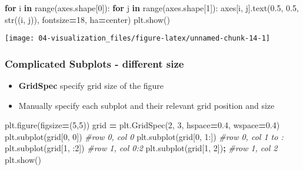 \documentclass[
]{book}
\newenvironment{Shaded}{\begin{snugshade}}{\end{snugshade}}
\newcommand{\BuiltInTok}[1]{#1}
\newcommand{\CommentTok}[1]{\textcolor[rgb]{0.37,0.37,0.37}{\textit{#1}}}
\newcommand{\ControlFlowTok}[1]{\textcolor[rgb]{0.27,0.27,0.27}{\textbf{#1}}}
\newcommand{\DecValTok}[1]{\textcolor[rgb]{0.06,0.06,0.06}{#1}}
\newcommand{\FloatTok}[1]{\textcolor[rgb]{0.06,0.06,0.06}{#1}}
\newcommand{\KeywordTok}[1]{\textcolor[rgb]{0.27,0.27,0.27}{\textbf{#1}}}
\newcommand{\NormalTok}[1]{#1}
\newcommand{\OperatorTok}[1]{\textcolor[rgb]{0.43,0.43,0.43}{\textbf{#1}}}
\newcommand{\StringTok}[1]{\textcolor[rgb]{0.5,0.5,0.5}{#1}}
\providecommand{\tightlist}{%
  \setlength{\itemsep}{0pt}\setlength{\parskip}{0pt}}
\begin{document}
\begin{Shaded}
\begin{Highlighting}[]
\ControlFlowTok{for}\NormalTok{ i }\KeywordTok{in} \BuiltInTok{range}\NormalTok{(axes.shape[}\DecValTok{0}\NormalTok{]):}
    \ControlFlowTok{for}\NormalTok{ j }\KeywordTok{in} \BuiltInTok{range}\NormalTok{(axes.shape[}\DecValTok{1}\NormalTok{]):}
\NormalTok{        axes[i, j].text(}\FloatTok{0.5}\NormalTok{, }\FloatTok{0.5}\NormalTok{, }\BuiltInTok{str}\NormalTok{((i, j)),}
\NormalTok{                      fontsize}\OperatorTok{=}\DecValTok{18}\NormalTok{, ha}\OperatorTok{=}\StringTok{\textquotesingle{}center\textquotesingle{}}\NormalTok{)}
\NormalTok{plt.show()}
\end{Highlighting}
\end{Shaded}

\texttt{[image: 04-visualization\_files/figure-latex/unnamed-chunk-14-1]}

\hypertarget{complicated-subplots---different-size}{%
\subsubsection{Complicated Subplots - different size}\label{complicated-subplots---different-size}}

\begin{itemize}
\tightlist
\item
  \textbf{GridSpec} specify grid size of the figure\\
\item
  Manually specify each subplot and their relevant grid position and size
\end{itemize}

\begin{Shaded}
\begin{Highlighting}[]
\NormalTok{plt.figure(figsize}\OperatorTok{=}\NormalTok{(}\DecValTok{5}\NormalTok{,}\DecValTok{5}\NormalTok{))}
\NormalTok{grid }\OperatorTok{=}\NormalTok{ plt.GridSpec(}\DecValTok{2}\NormalTok{, }\DecValTok{3}\NormalTok{, hspace}\OperatorTok{=}\FloatTok{0.4}\NormalTok{, wspace}\OperatorTok{=}\FloatTok{0.4}\NormalTok{)}
\NormalTok{plt.subplot(grid[}\DecValTok{0}\NormalTok{, }\DecValTok{0}\NormalTok{])  }\CommentTok{\#row 0, col 0}
\NormalTok{plt.subplot(grid[}\DecValTok{0}\NormalTok{, }\DecValTok{1}\NormalTok{:]) }\CommentTok{\#row 0, col 1 to :}
\NormalTok{plt.subplot(grid[}\DecValTok{1}\NormalTok{, :}\DecValTok{2}\NormalTok{]) }\CommentTok{\#row 1, col 0:2 }
\NormalTok{plt.subplot(grid[}\DecValTok{1}\NormalTok{, }\DecValTok{2}\NormalTok{])}\OperatorTok{;} \CommentTok{\#row 1, col 2}
\NormalTok{plt.show()}
\end{Highlighting}
\end{Shaded}
\end{document}
